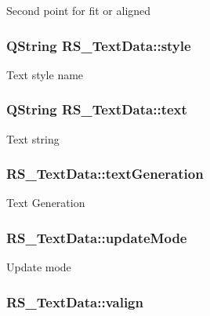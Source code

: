 Second point for fit or aligned \hypertarget{classRS__TextData_a5ff7d519c1cbfa01ac4024225c0b458e}{
\subsubsection[{style}]{\setlength{\rightskip}{0pt plus 5cm}Q\-String R\-S\-\_\-\-Text\-Data\-::style}}\label{classRS__TextData_a5ff7d519c1cbfa01ac4024225c0b458e}
Text style name \hypertarget{classRS__TextData_a7594aceaa8b50686d8244f854e09f875}{
\subsubsection[{text}]{\setlength{\rightskip}{0pt plus 5cm}Q\-String R\-S\-\_\-\-Text\-Data\-::text}}\label{classRS__TextData_a7594aceaa8b50686d8244f854e09f875}
Text string \hypertarget{classRS__TextData_ac0a610f44a6e4c236068318caad84c02}{
\subsubsection[{text\-Generation}]{ R\-S\-\_\-\-Text\-Data\-::text\-Generation}}\label{classRS__TextData_ac0a610f44a6e4c236068318caad84c02}
Text Generation \hypertarget{classRS__TextData_ae0bec40e64eadd73083164e0fa40d687}{
\subsubsection[{update\-Mode}]{ R\-S\-\_\-\-Text\-Data\-::update\-Mode}}\label{classRS__TextData_ae0bec40e64eadd73083164e0fa40d687}
Update mode \hypertarget{classRS__TextData_a11c12106c3385ad3377e1cb8fa98d6fc}{
\subsubsection[{valign}]{ R\-S\-\_\-\-Text\-Data\-::valign}}\label{classRS__TextData_a11c12106c3385ad3377e1cb8fa98d6fc}
